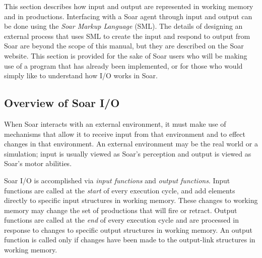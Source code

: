 This section describes how input and output are represented in working memory
and in productions. Interfacing with a Soar agent through input and output can 
be done using the \textit{Soar Markup Language} (SML). The details of designing 
an external process that uses SML to create the input and respond to output from 
Soar are beyond the scope of this manual, but they are described 
on the Soar website. This section is provided for the sake of Soar users who will be making
use of a program that has already been implemented, or for those who would
simply like to understand how I/O works in Soar.


\subsection{Overview of Soar I/O}

When Soar interacts with an external environment, it must make use of
mechanisms that allow it to receive input from that environment and to effect
changes in that environment. An external environment may be the real world or
a simulation; input is usually viewed as Soar's perception and output is
viewed as Soar's motor abilities.


Soar I/O is accomplished via \emph{input functions} and
\emph{output functions}. Input functions are called at the 
\emph{start}
of every execution cycle, and add elements directly to specific input
structures in working memory.  These changes to working memory
may change the set of productions that will fire or retract. 
Output functions are called
at the \emph{end} of every execution cycle and are processed in response to
changes to specific output structures in working memory.  An output function
is called only if changes have been made to the output-link structures in
working memory.

